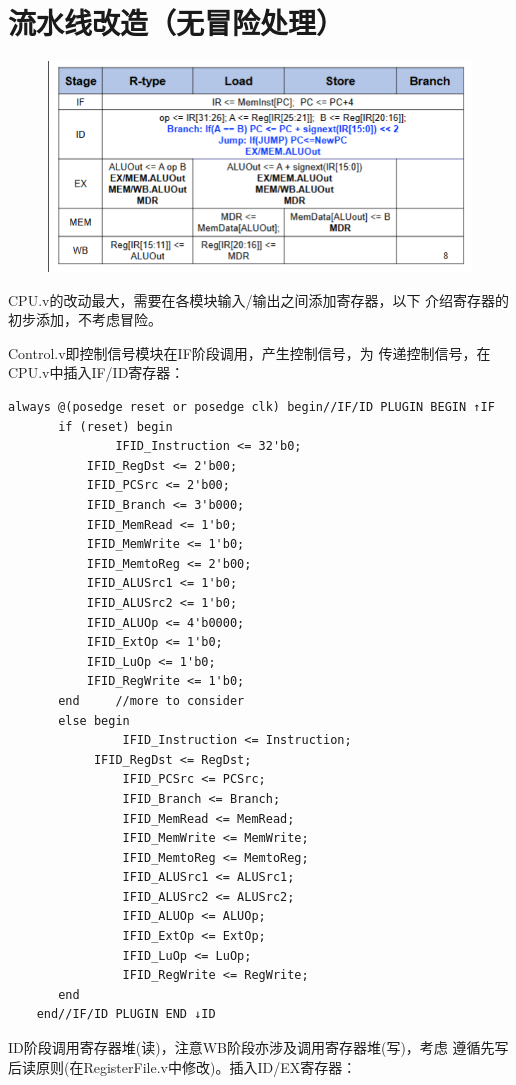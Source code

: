 \documentclass[10pt]{article}
\begin{document}
\newpage
\section{流水线改造（无冒险处理）}
\begin{figure}[H]
    \centering
    \includegraphics[scale=0.75]{table.png}
    \end{figure}
CPU.v的改动最大，需要在各模块输入/输出之间添加寄存器，以下
介绍寄存器的初步添加，不考虑冒险。

Control.v即控制信号模块在IF阶段调用，产生控制信号，为
传递控制信号，在CPU.v中插入IF/ID寄存器：
\begin{lstlisting}[style={verilog-style}]
	always @(posedge reset or posedge clk) begin//IF/ID PLUGIN BEGIN ↑IF
	   if (reset) begin
               IFID_Instruction <= 32'b0;
	       IFID_RegDst <= 2'b00;
	       IFID_PCSrc <= 2'b00;
	       IFID_Branch <= 3'b000;
	       IFID_MemRead <= 1'b0;
	       IFID_MemWrite <= 1'b0;
	       IFID_MemtoReg <= 2'b00;
	       IFID_ALUSrc1 <= 1'b0;
	       IFID_ALUSrc2 <= 1'b0;
	       IFID_ALUOp <= 4'b0000;
	       IFID_ExtOp <= 1'b0;
	       IFID_LuOp <= 1'b0;
	       IFID_RegWrite <= 1'b0;
	   end	   //more to consider
	   else begin
                IFID_Instruction <= Instruction;
	        IFID_RegDst <= RegDst;
                IFID_PCSrc <= PCSrc;
                IFID_Branch <= Branch;
                IFID_MemRead <= MemRead;
                IFID_MemWrite <= MemWrite;
                IFID_MemtoReg <= MemtoReg;
                IFID_ALUSrc1 <= ALUSrc1;
                IFID_ALUSrc2 <= ALUSrc2;
                IFID_ALUOp <= ALUOp;
                IFID_ExtOp <= ExtOp;
                IFID_LuOp <= LuOp;
                IFID_RegWrite <= RegWrite;
	   end
	end//IF/ID PLUGIN END ↓ID
\end{lstlisting}

ID阶段调用寄存器堆(读)，注意WB阶段亦涉及调用寄存器堆(写)，考虑
遵循先写后读原则(在RegisterFile.v中修改)。插入ID/EX寄存器：
\begin{lstlisting}[style={verilog-style}]

\end{lstlisting}
\end{document}
